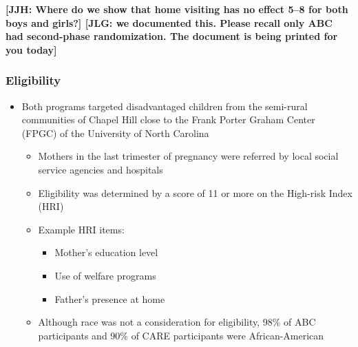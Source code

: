 \documentclass[static]{JJH-Beamer}
\begin{document}
\textbf{[JJH: Where do we show that home visiting has no effect 5--8 for both boys and girls?] [JLG: we documented this. Please recall only ABC had second-phase randomization. The document is being printed for you today]}
\clearpage
\begin{frame}
\frametitle{Eligibility}

\begin{itemize}
\item Both programs targeted disadvantaged children from the semi-rural communities of Chapel Hill close to the Frank Porter Graham Center (FPGC) of the University of North Carolina
	\begin{itemize}
	\item Mothers in the last trimester of pregnancy were referred by local social service agencies and hospitals 		
	\item Eligibility was determined by a score of 11 or more on the High-risk Index (HRI)
	\item Example HRI items:
		\begin{itemize}
		\item Mother's education level
		\item Use of welfare programs
		\item Father's presence at home
		\end{itemize}
    \item Although race was not a consideration for eligibility, 98\% of ABC participants and 90\% of CARE participants were African-American
	\end{itemize}
\end{itemize}

\end{frame}
\end{document}
